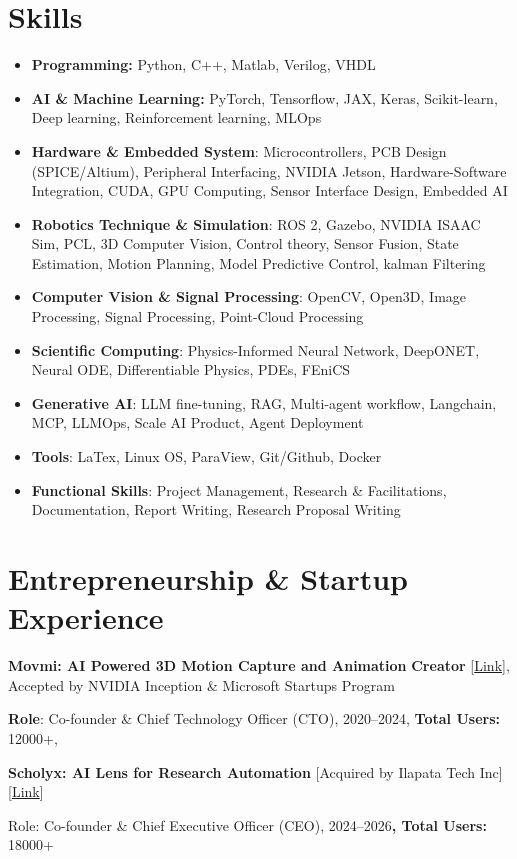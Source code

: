 \documentclass[10pt,letterpaper]{article}
\newcommand{\lk}[2]{[\href{#1}{#2}]}
\begin{document}
\section{Skills}
\begin{itemize}
  \item \textbf{Programming:} Python, C++, Matlab, Verilog, VHDL
  \item \textbf{AI \& Machine Learning:} PyTorch, Tensorflow, JAX, Keras, Scikit-learn, Deep learning, Reinforcement learning, MLOps
  \item \textbf{Hardware \& Embedded System}: Microcontrollers, PCB Design (SPICE/Altium), Peripheral Interfacing, NVIDIA Jetson, Hardware-Software Integration, CUDA, GPU Computing, Sensor Interface Design, Embedded AI
  \item \textbf{Robotics Technique \& Simulation}: ROS 2, Gazebo, NVIDIA ISAAC Sim, PCL, 3D Computer Vision, Control theory, Sensor Fusion, State Estimation, Motion Planning, Model Predictive Control, kalman Filtering
  \item \textbf{Computer Vision \& Signal Processing}: OpenCV, Open3D, Image Processing, Signal Processing, Point-Cloud Processing
  \item \textbf{Scientific Computing}: Physics-Informed Neural Network, DeepONET, Neural ODE, Differentiable Physics, PDEs, FEniCS
  \item \textbf{Generative AI}: LLM fine-tuning, RAG, Multi-agent workflow, Langchain, MCP, LLMOps, Scale AI Product, Agent Deployment
  \item \textbf{Tools}: LaTex, Linux OS, ParaView, Git/Github, Docker
  \item \textbf{Functional Skills}: Project Management, Research \& Facilitations, Documentation, Report Writing, Research Proposal Writing
\end{itemize}

\section{Entrepreneurship \& Startup Experience}
\textbf{Movmi: AI Powered 3D Motion Capture and Animation} \textbf{Creator} \lk{https://movmi.co/}{Link}, Accepted by NVIDIA Inception \& Microsoft Startups Program\par
\textbf{Role}: Co-founder \& Chief Technology Officer (CTO), 2020--2024, \textbf{Total Users:} 12000+,\par
\vspace{2pt}
\textbf{Scholyx: AI Lens for Research Automation} [Acquired by Ilapata Tech Inc] \lk{https://scholyx.com/}{Link}\par
Role: Co-founder \& Chief Executive Officer (CEO), 2024--2026\textbf{, Total Users:} 18000+\par
\end{document}
